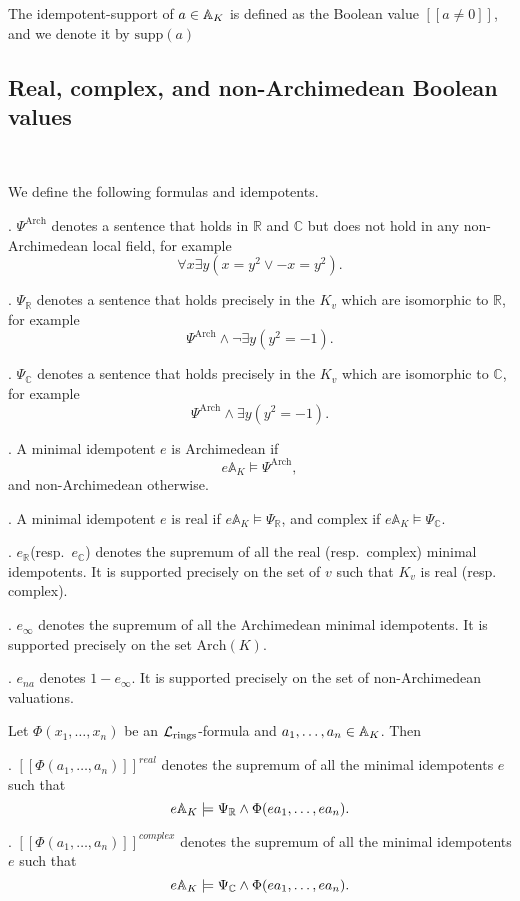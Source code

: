 \documentclass[12pt]{amsart}
\def\A{\mathbb{A}}
\def\R{\mathbb{R}}
\def\C{\mathbb{C}}
\def\cL{\mathcal{L}}
\def\C{\mathbb{C}}
\def\R{\mathbb{R}}
\def\cL{\mathcal{L}}
\numberwithin{equation}{section}
\begin{document}
The idempotent-support of $a\in \Bbb A_K$ is defined as 
the Boolean value $[[a\neq 0]]$, and we denote it by $\mathrm{supp}(a)$

\medskip

\subsection{\bf Real, complex, and non-Archimedean Boolean values}\label{ssec-arch}

\

\medskip

We define the following formulas and idempotents.

. $\Psi^{\mathrm{Arch}}$ denotes a sentence that holds in $\R$ and $\C$ but does not hold in any 
non-Archimedean local field, for example 
$$\forall x \exists y (x=y^2 \vee -x=y^2).$$ 

. $\Psi_{\R}$ denotes a sentence that holds precisely in the $K_v$ which are isomorphic to $\R$, 
for example 
$$\Psi^{\mathrm{Arch}}\wedge \neg \exists y (y^2=-1).$$ 

. $\Psi_{\C}$ denotes a sentence that holds precisely in the $K_v$ which are isomorphic to $\C$, 
for example $$\Psi^{\mathrm{Arch}}\wedge \exists y (y^2=-1).$$ 

. A minimal idempotent $e$ is Archimedean if $$e\A_K\models \Psi^{\mathrm{Arch}},$$
and non-Archimedean otherwise. 

. A minimal idempotent $e$ is real if $e\A_K\models \Psi_{\R}$, and complex if $e\A_K\models \Psi_{\C}$.

. $e_{\R} $(resp.\ $e_{\C}$) denotes the supremum of all the real (resp.~complex) minimal idempotents. It is supported precisely on the set of $v$ such that $K_v$ is real  (resp. complex).

. $e_{\infty}$ denotes the supremum of all the Archimedean minimal idempotents. It is supported precisely on the set $\mathrm{Arch}(K)$.

. $e_{na}$ denotes $1-e_{\infty}$. It is supported precisely on the set of non-Archimedean valuations. 

Let $\Phi(x_1,\dots,x_n)$ be an $\cL_{\rm{rings}}$-formula and $a_1,\dots,a_n\in \Bbb A_K$. Then 

. $[[\Phi(a_1,\dots,a_n)]]^{real}$ denotes the supremum of all the minimal idempotents $e$ 
such that 
$$e\Bbb A_K\models \Psi_{\R} \wedge \Phi(ea_1,\dots,ea_n).$$

. $[[\Phi(a_1,\dots,a_n)]]^{complex}$ denotes the supremum of all the minimal idempotents $e$ 
such that $$e\Bbb A_K\models \Psi_{\C} \wedge \Phi(ea_1,\dots,ea_n).$$
\end{document}
